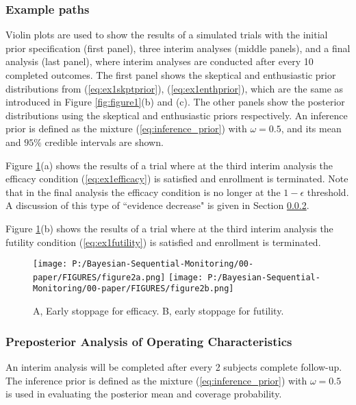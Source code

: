 \documentclass[12pt]{article}
\begin{document}
\subsubsection{Example paths}
Violin plots are used to show the results of a simulated trials with the initial prior specification (first panel), three interim analyses (middle panels), and a final analysis (last panel), where interim analyses are conducted after every 10 completed outcomes. The first panel shows the skeptical and enthusiastic prior distributions from (\ref{eq:ex1skptprior}), (\ref{eq:ex1enthprior}), which are the same as introduced in Figure \ref{fig:figure1}(b) and (c). The other panels show the posterior distributions using the skeptical and enthusiastic priors respectively. An inference prior is defined as the mixture (\ref{eq:inference_prior}) with $\omega=0.5$, and its mean and $95\%$ credible intervals are shown.

Figure \ref{fig:figure2}(a) shows the results of a trial where at the third interim analysis the efficacy condition (\ref{eq:ex1efficacy}) is satisfied and enrollment is terminated. Note that in the final analysis the efficacy condition is no longer at the $1-\epsilon$ threshold. A discussion of this type of ``evidence decrease" is given in Section \ref{sec:ex1.1}.

Figure \ref{fig:figure2}(b) shows the results of a trial where at the third interim analysis the futility condition (\ref{eq:ex1futility}) is satisfied and enrollment is terminated. 

\begin{figure}\begin{center}
    \texttt{[image: P:/Bayesian-Sequential-Monitoring/00-paper/FIGURES/figure2a.png]}
    \texttt{[image: P:/Bayesian-Sequential-Monitoring/00-paper/FIGURES/figure2b.png]}
    \caption{A, Early stoppage for efficacy. B, early stoppage for futility.}
	\label{fig:figure2}

 
\end{center}\end{figure}
\subsubsection{Preposterior Analysis of Operating Characteristics}\label{sec:ex1.1}
An interim analysis will be completed after every 2 subjects complete follow-up. The inference prior is defined as the mixture (\ref{eq:inference_prior}) with $\omega=0.5$ is used in evaluating the posterior mean and coverage probability.
\end{document}
